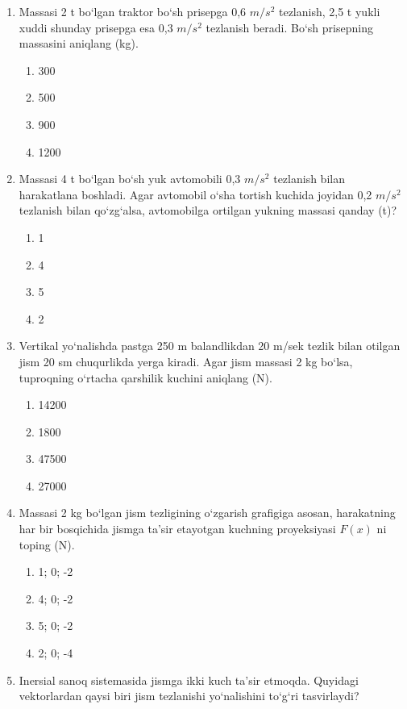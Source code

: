 \begin{enumerate}
\item Massasi 2 t bo‘lgan traktor bo‘sh prisepga 0,6 $m/s^2$ tezlanish, 2,5 t yukli xuddi shunday prisepga esa 0,3 $m/s^2$ tezlanish beradi. Bo‘sh prisepning massasini aniqlang (kg).
\begin{enumerate}[label=\Alph*)]
\item 300
\item 500
\item 900
\item 1200
\end{enumerate}

\item Massasi 4 t bo‘lgan bo‘sh yuk avtomobili 0,3 $m/s^2$ tezlanish bilan harakatlana boshladi. Agar avtomobil o‘sha tortish kuchida joyidan 0,2 $m/s^2$ tezlanish bilan qo‘zg‘alsa, avtomobilga ortilgan yukning massasi qanday (t)?
\begin{enumerate}[label=\Alph*)]
\item 1
\item 4
\item 5
\item 2
\end{enumerate}

\item Vertikal yo‘nalishda pastga 250 m balandlikdan 20 m/sek tezlik bilan otilgan jism 20 sm chuqurlikda yerga kiradi. Agar jism massasi 2 kg bo‘lsa, tuproqning o‘rtacha qarshilik kuchini aniqlang (N).
\begin{enumerate}[label=\Alph*)]
\item 14200
\item 1800
\item 47500
\item 27000
\end{enumerate}

\item Massasi 2 kg bo‘lgan jism tezligining o‘zgarish grafigiga asosan, harakatning har bir bosqichida jismga ta’sir etayotgan kuchning proyeksiyasi $F(x)$ ni toping (N).
\begin{enumerate}[label=\Alph*)]
\item 1; 0; -2
\item 4; 0; -2
\item 5; 0; -2
\item 2; 0; -4
\end{enumerate}

\item Inersial sanoq sistemasida jismga ikki kuch ta’sir etmoqda. Quyidagi vektorlardan qaysi biri jism tezlanishi yo‘nalishini to‘g‘ri tasvirlaydi?


\end{enumerate}
